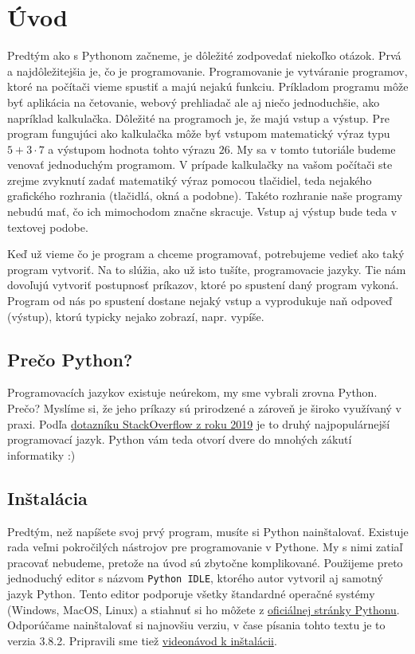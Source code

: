 \documentclass{article}
\begin{document}
\tableofcontents
\newpage

\section{Úvod}
Predtým ako s Pythonom začneme, je dôležité zodpovedať niekoľko otázok. Prvá a najdôležitejšia je, čo je programovanie. Programovanie je vytváranie programov, ktoré na počítači vieme spustiť a majú nejakú funkciu. Príkladom programu môže byť aplikácia na četovanie, webový prehliadač ale aj niečo jednoduchšie, ako napríklad kalkulačka. Dôležité na programoch je, že majú vstup a výstup. Pre program fungujúci ako kalkulačka môže byť vstupom matematický výraz typu $5+3\cdot 7$ a výstupom hodnota tohto výrazu $26$. My sa v tomto tutoriále budeme venovať jednoduchým programom. V prípade kalkulačky na vašom počítači ste zrejme zvyknutí zadať matematiký výraz pomocou tlačidiel, teda nejakého grafického rozhrania (tlačidlá, okná a podobne). Takéto rozhranie naše programy nebudú mať, čo ich mimochodom značne skracuje. Vstup aj výstup bude teda v textovej podobe.

Keď už vieme čo je program a chceme programovať, potrebujeme vedieť ako taký program vytvoriť. Na to slúžia, ako už isto tušíte, programovacie jazyky. Tie nám dovoľujú vytvoriť postupnosť príkazov, ktoré po spustení daný program vykoná. Program od nás po spustení dostane nejaký vstup a vyprodukuje naň odpoveď (výstup), ktorú typicky nejako zobrazí, napr. vypíše.

\subsection{Prečo Python?}
Programovacích jazykov existuje neúrekom, my sme vybrali zrovna Python. Prečo? Myslíme si, že jeho príkazy sú prirodzené a zároveň je široko využívaný v praxi. Podľa \href{https://insights.stackoverflow.com/survey/2019#technology-_-programming-scripting-and-markup-languages}{dotazníku StackOverflow z roku 2019} je to druhý najpopulárnejší programovací jazyk. Python vám teda otvorí dvere do mnohých zákutí informatiky :)

\subsection{Inštalácia}
Predtým, než napíšete svoj prvý program, musíte si Python nainštalovať. Existuje rada veľmi pokročilých nástrojov pre programovanie v Pythone. My s nimi zatiaľ pracovať nebudeme, pretože na úvod sú zbytočne komplikované.
Použijeme preto jednoduchý editor s názvom \texttt{Python IDLE}, ktorého autor vytvoril aj samotný jazyk Python. Tento editor podporuje všetky štandardné operačné systémy (Windows, MacOS, Linux) a stiahnuť si ho môžete z \href{https://www.python.org/downloads/}{oficiálnej stránky Pythonu}. Odporúčame nainštalovať si najnovšiu verziu, v čase písania tohto textu je to verzia 3.8.2. Pripravili sme tiež \href{https://www.youtube.com/watch?v=_oLcUfkgxSI}{videonávod k inštalácii}.
\end{document}

